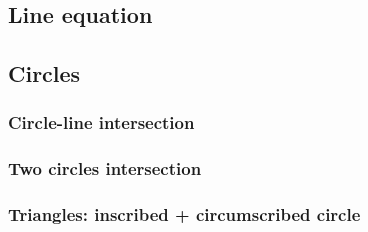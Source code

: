 \documentclass[a4paper]{article}
\begin{document}
\begin{multicols*}{3}
    \subsection{Line equation}
        
    \subsection{Circles}
        \subsubsection{Circle-line intersection}
            
        \subsubsection{Two circles intersection}
            
        \subsubsection{Triangles: inscribed + circumscribed circle}
            

\end{multicols*}
\end{document}

